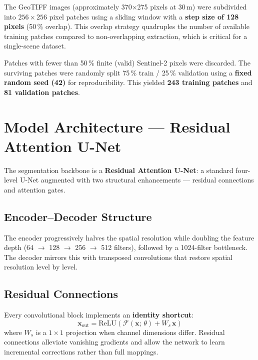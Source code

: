 \documentclass[12pt,a4paper]{article}
\begin{document}
The GeoTIFF images (approximately 370$\times$275 pixels at 30\,m) were
subdivided into $256 \times 256$ pixel patches using a sliding window with a
\textbf{step size of 128 pixels} (50\,\% overlap). This overlap strategy
quadruples the number of available training patches compared to
non-overlapping extraction, which is critical for a single-scene dataset.

Patches with fewer than 50\,\% finite (valid) Sentinel-2 pixels were
discarded. The surviving patches were randomly split 75\,\% train /
25\,\% validation using a \textbf{fixed random seed (42)} for
reproducibility. This yielded \textbf{243 training patches} and
\textbf{81 validation patches}.

\section{Model Architecture — Residual Attention U-Net}

The segmentation backbone is a \textbf{Residual Attention U-Net}: a
standard four-level U-Net augmented with two structural enhancements —
residual connections and attention gates.

\subsection{Encoder–Decoder Structure}

The encoder progressively halves the spatial resolution while doubling the
feature depth (64 $\to$ 128 $\to$ 256 $\to$ 512 filters), followed by a
1024-filter bottleneck. The decoder mirrors this with transposed convolutions
that restore spatial resolution level by level.

\subsection{Residual Connections}

Every convolutional block implements an \textbf{identity shortcut}:
\begin{equation}
  \mathbf{x}_\text{out} = \text{ReLU}\!\left(\mathcal{F}(\mathbf{x};\,\theta) + W_s\,\mathbf{x}\right)
\end{equation}
where $W_s$ is a $1\times1$ projection when channel dimensions differ.
Residual connections alleviate vanishing gradients and allow the network to
learn incremental corrections rather than full mappings.
\end{document}
